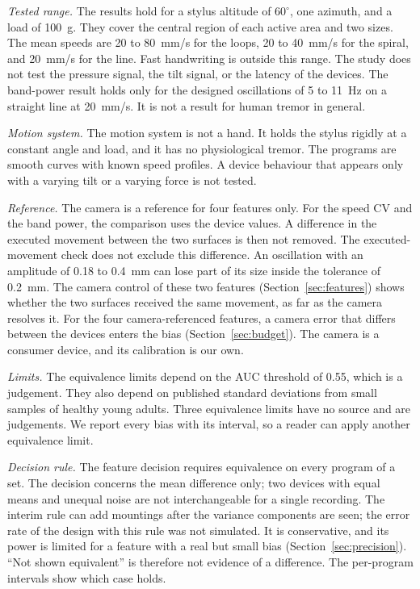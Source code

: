 \emph{Tested range.}
The results hold for a stylus altitude of $60^\circ$, one azimuth, and a load of 100~g.
They cover the central region of each active area and two sizes.
The mean speeds are 20 to 80~mm/s for the loops, 20 to 40~mm/s for the spiral, and 20~mm/s for the line.
Fast handwriting is outside this range.
The study does not test the pressure signal, the tilt signal, or the latency of the devices.
The band-power result holds only for the designed oscillations of 5 to 11~Hz on a straight line at 20~mm/s.
It is not a result for human tremor in general.

\emph{Motion system.}
The motion system is not a hand.
It holds the stylus rigidly at a constant angle and load, and it has no physiological tremor.
The programs are smooth curves with known speed profiles.
A device behaviour that appears only with a varying tilt or a varying force is not tested.

\emph{Reference.}
The camera is a reference for four features only.
For the speed CV and the band power, the comparison uses the device values.
A difference in the executed movement between the two surfaces is then not removed.
The executed-movement check does not exclude this difference.
An oscillation with an amplitude of 0.18 to 0.4~mm can lose part of its size inside the tolerance of 0.2~mm.
The camera control of these two features (Section~\ref{sec:features}) shows whether the two surfaces received the same movement, as far as the camera resolves it.
For the four camera-referenced features, a camera error that differs between the devices enters the bias (Section~\ref{sec:budget}).
The camera is a consumer device, and its calibration is our own.

\emph{Limits.}
The equivalence limits depend on the AUC threshold of 0.55, which is a judgement.
They also depend on published standard deviations from small samples of healthy young adults.
Three equivalence limits have no source and are judgements.
We report every bias with its interval, so a reader can apply another equivalence limit.

\emph{Decision rule.}
The feature decision requires equivalence on every program of a set.
The decision concerns the mean difference only; two devices with equal means and unequal noise are not interchangeable for a single recording.
The interim rule can add mountings after the variance components are seen; the error rate of the design with this rule was not simulated.
It is conservative, and its power is limited for a feature with a real but small bias (Section~\ref{sec:precision}).
``Not shown equivalent'' is therefore not evidence of a difference.
The per-program intervals show which case holds.

